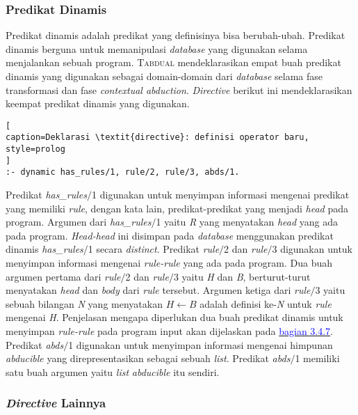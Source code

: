\subsubsection{Predikat Dinamis}

Predikat dinamis adalah predikat yang definisinya bisa berubah-ubah. Predikat dinamis berguna untuk memanipulasi \textit{database} yang digunakan selama menjalankan sebuah program. \textsc{Tabdual} mendeklarasikan empat buah predikat dinamis yang digunakan sebagai domain-domain dari \textit{database} selama fase transformasi dan fase \textit{contextual abduction}. \textit{Directive} berikut ini mendeklarasikan keempat predikat dinamis yang digunakan. 
\\

\begin{lstlisting}[
caption=Deklarasi \textit{directive}: definisi operator baru,
style=prolog
]
:- dynamic has_rules/1, rule/2, rule/3, abds/1.
\end{lstlisting}

Predikat \textit{has\_rules$/$}1 digunakan untuk menyimpan informasi mengenai predikat yang memiliki \textit{rule}, dengan kata lain, predikat-predikat yang menjadi \textit{head} pada program. Argumen dari \textit{has\_rules$/$}1 yaitu \textit{R} yang menyatakan \textit{head} yang ada pada program. \textit{Head-head} ini disimpan pada \textit{database} menggunakan predikat dinamis \textit{has\_rules$/$}1 secara \textit{distinct}. Predikat \textit{rule$/$}2 dan \textit{rule$/$}3 digunakan untuk menyimpan informasi mengenai \textit{rule-rule} yang ada pada program. Dua buah argumen pertama dari \textit{rule$/$}2 dan \textit{rule$/$}3 yaitu \textit{H} dan \textit{B}, berturut-turut menyatakan \textit{head} dan \textit{body} dari \textit{rule} tersebut. Argumen ketiga dari \textit{rule$/$}3 yaitu sebuah bilangan \textit{N} yang menyatakan \textit{$H \leftarrow B$} adalah definisi ke-\textit{N} untuk \textit{rule} mengenai \textit{H}.\label{rule2to3} Penjelasan mengapa diperlukan dua buah predikat dinamis untuk menyimpan \textit{rule-rule} pada program input akan dijelaskan pada \hyperref[subsec:add_indices]{\textcolor{blue}{bagian 3.4.7}}. Predikat \textit{abds$/$}1 digunakan untuk menyimpan informasi mengenai himpunan \textit{abducible} yang direpresentasikan sebagai sebuah \textit{list}. Predikat \textit{abds$/$}1 memiliki satu buah argumen yaitu \textit{list} \textit{abducible} itu sendiri.

\subsubsection{\textit{Directive} Lainnya}

